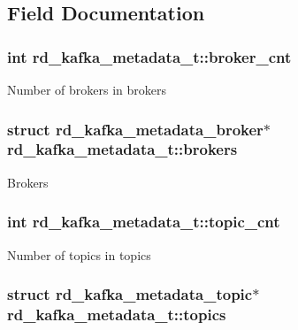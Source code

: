 \subsection{Field Documentation}
\hypertarget{structrd__kafka__metadata__t_a856ef1431ec96dc5e17aa201eabb471d}{
\subsubsection[{broker\_\-cnt}]{\setlength{\rightskip}{0pt plus 5cm}int {\bf rd\_\-kafka\_\-metadata\_\-t::broker\_\-cnt}}}
\label{structrd__kafka__metadata__t_a856ef1431ec96dc5e17aa201eabb471d}
Number of brokers in {\ttfamily brokers} \hypertarget{structrd__kafka__metadata__t_ad42c894b30cf7bd1d2a737b3ebc41e72}{
\subsubsection[{brokers}]{\setlength{\rightskip}{0pt plus 5cm}struct rd\_\-kafka\_\-metadata\_\-broker$\ast$ {\bf rd\_\-kafka\_\-metadata\_\-t::brokers}}}
\label{structrd__kafka__metadata__t_ad42c894b30cf7bd1d2a737b3ebc41e72}
Brokers \hypertarget{structrd__kafka__metadata__t_acaafc5b2980d35330c213dfa7b3ae063}{
\subsubsection[{topic\_\-cnt}]{\setlength{\rightskip}{0pt plus 5cm}int {\bf rd\_\-kafka\_\-metadata\_\-t::topic\_\-cnt}}}
\label{structrd__kafka__metadata__t_acaafc5b2980d35330c213dfa7b3ae063}
Number of topics in {\ttfamily topics} \hypertarget{structrd__kafka__metadata__t_aaf7472220f7c197fb7cd4a73a40ba1b8}{
\subsubsection[{topics}]{\setlength{\rightskip}{0pt plus 5cm}struct rd\_\-kafka\_\-metadata\_\-topic$\ast$ {\bf rd\_\-kafka\_\-metadata\_\-t::topics}}}
